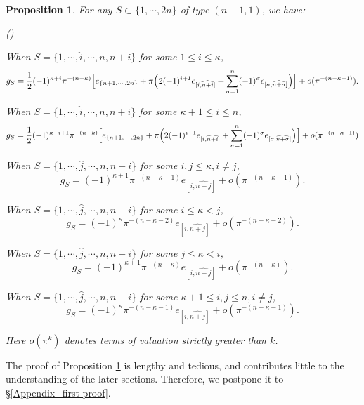 \documentclass[pdflatex,sn-mathphys-num]{sn-jnl}%
\theoremstyle{thmstyleone}%
\newtheorem{proposition}[subsubsection]{Proposition}%
\theoremstyle{thmstyletwo}%
\numberwithin{equation}{subsection}
\theoremstyle{thmstylethree}%
\newcommand{\wh}{\widehat}
\newenvironment{altenumerate}
	{\begin{list}
			{(\theenumi) }
			{\usecounter{enumi}
				\setlength{\labelwidth}{0pt}
				\setlength{\labelsep}{0pt}
				\setlength{\leftmargin}{0pt}
				\setlength{\itemsep}{\the\smallskipamount}
				\renewcommand{\theenumi}{\roman{enumi}}
		}}
		{\end{list}}
\begin{document}
\begin{proposition}\label{equ_ss-comp:g_S}
For any $S\subset \{1,\cdots,2n\}$ of type $(n-1,1)$, we have:
\begin{altenumerate}
\item When $S=\{1,\cdots,\hat{i},\cdots,n,n+i\}$ for some $1\leq i\leq \kappa$,
\begin{equation*}
g_S=\frac{1}{2}(-1)^{\kappa+i}\pi^{-(n-\kappa)}\Bigl[
e_{\{n+1,\cdots,2n\}}+\pi\Bigl( 2(-1)^{i+1}e_{[i,\wh{n+i}]}+\sum_{\sigma=1}^n(-1)^\sigma e_{[\sigma,\wh{n+\sigma}]}\Bigr)\Bigr]+o(\pi^{-(n-\kappa-1)}).
\end{equation*}

\item When $S=\{1,\cdots,\hat{i},\cdots,n,n+i\}$ for some $\kappa+1\leq i\leq n$,
\begin{equation*}
g_S=\frac{1}{2}(-1)^{\kappa+i+1}\pi^{-(n-k)}\Bigl[
e_{\{n+1,\cdots,2n\}}+\pi   
\Bigl(2(-1)^{i+1} e_{[i,\wh{n+i}]}+\sum_{\sigma=1}^n(-1)^\sigma e_{[\sigma,\wh{n+\sigma}]}\Bigr)\Bigr]+o(\pi^{-(n-\kappa-1)})
\end{equation*}
		
\item When $S=\{1,\cdots,\hat{j},\cdots,n,n+i\}$ for some $i,j\leq \kappa, i\neq j$,
		\begin{equation*}
			g_S=(-1)^{\kappa+1}\pi^{-(n-\kappa-1)} e_{[i,\wh{n+j}]}+o(\pi^{-(n-\kappa-1)}).
		\end{equation*}
\item When $S=\{1,\cdots,\hat{j},\cdots,n,n+i\}$ for some $i\leq \kappa<j$,
		\begin{equation*}
			g_S=(-1)^{\kappa}\pi^{-(n-\kappa-2)} e_{[i,\wh{n+j}]}+o(\pi^{-(n-\kappa-2)}).
		\end{equation*}
\item When $S=\{1,\cdots,\hat{j},\cdots,n,n+i\}$ for some $j\leq \kappa<i$,
		\begin{equation*}
			g_S=(-1)^{\kappa+1}\pi^{-(n-\kappa)} e_{[i,\wh{n+j}]}+o(\pi^{-(n-\kappa)}).
		\end{equation*}
\item When $S=\{1,\cdots,\hat{j},\cdots,n,n+i\}$ for some $\kappa+1\leq i,j\leq n,i\neq j$,
		\begin{equation*}
			g_S=(-1)^{\kappa}\pi^{-(n-\kappa-1)} e_{[i,\wh{n+j}]}+o(\pi^{-(n-\kappa-1)}).
		\end{equation*}
		\end{altenumerate}
Here $o(\pi^k)$ denotes terms of valuation strictly greater than $k$.
\end{proposition}
The proof of Proposition \ref{equ_ss-comp:g_S} is lengthy and tedious, and contributes little to the understanding of the later sections. Therefore, we postpone it to \S \ref{Appendix_first-proof}.
\end{document}
